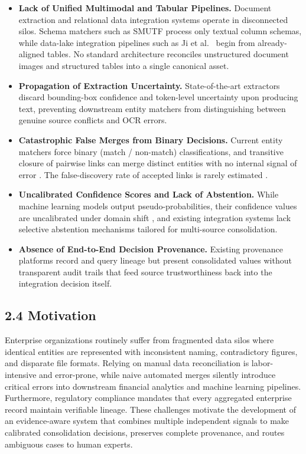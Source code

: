 \documentclass[12pt,a4paper]{article}
\begin{document}
\begin{itemize}
  \item \textbf{Lack of Unified Multimodal and Tabular Pipelines.} Document extraction and relational data integration systems operate in disconnected silos. Schema matchers such as SMUTF \cite{smutf2025} process only textual column schemas, while data-lake integration pipelines such as Ji et al.\ \cite{ji2025tableintegration} begin from already-aligned tables. No standard architecture reconciles unstructured document images and structured tables into a single canonical asset.
  \item \textbf{Propagation of Extraction Uncertainty.} State-of-the-art extractors discard bounding-box confidence and token-level uncertainty upon producing text, preventing downstream entity matchers from distinguishing between genuine source conflicts and OCR errors.
  \item \textbf{Catastrophic False Merges from Binary Decisions.} Current entity matchers force binary (match / non-match) classifications, and transitive closure of pairwise links can merge distinct entities with no internal signal of error \cite{christen2025cluster}. The false-discovery rate of accepted links is rarely estimated \cite{robach2025falsediscovery}.
  \item \textbf{Uncalibrated Confidence Scores and Lack of Abstention.} While machine learning models output pseudo-probabilities, their confidence values are uncalibrated under domain shift \cite{silvafilho2023calibration}, and existing integration systems lack selective abstention mechanisms tailored for multi-source consolidation.
  \item \textbf{Absence of End-to-End Decision Provenance.} Existing provenance platforms \cite{gregori2025prolit} record and query lineage but present consolidated values without transparent audit trails that feed source trustworthiness back into the integration decision itself.
\end{itemize}

\subsection*{2.4 Motivation}

Enterprise organizations routinely suffer from fragmented data silos where identical entities are represented with inconsistent naming, contradictory figures, and disparate file formats. Relying on manual data reconciliation is labor-intensive and error-prone, while naive automated merges silently introduce critical errors into downstream financial analytics and machine learning pipelines. Furthermore, regulatory compliance mandates that every aggregated enterprise record maintain verifiable lineage. These challenges motivate the development of an evidence-aware system that combines multiple independent signals to make calibrated consolidation decisions, preserves complete provenance, and routes ambiguous cases to human experts.
\end{document}
